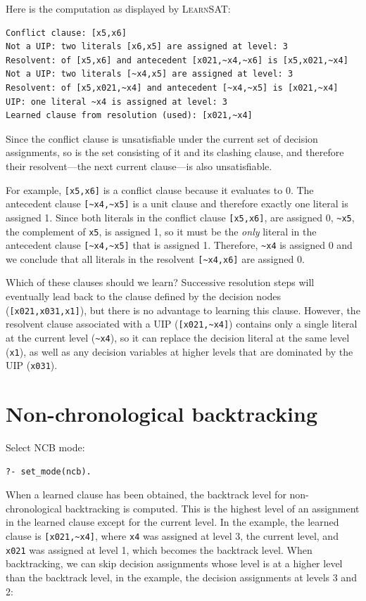 \documentclass[11pt]{report}
\newcommand*{\p}[1]{\textup{\texttt{#1}}}
\newcommand*{\ls}{\textsc{LearnSAT}}
\begin{document}
Here is the computation as displayed by \ls{}:
\begin{verbatim}
Conflict clause: [x5,x6]
Not a UIP: two literals [x6,x5] are assigned at level: 3
Resolvent: of [x5,x6] and antecedent [x021,~x4,~x6] is [x5,x021,~x4]
Not a UIP: two literals [~x4,x5] are assigned at level: 3
Resolvent: of [x5,x021,~x4] and antecedent [~x4,~x5] is [x021,~x4]
UIP: one literal ~x4 is assigned at level: 3
Learned clause from resolution (used): [x021,~x4]
\end{verbatim}

Since the conflict clause is unsatisfiable under the current set of
decision assignments, so is the set consisting of it and its clashing
clause, and therefore their resolvent---the next current clause---is
also unsatisfiable.

For example, \verb+[x5,x6]+ is a conflict clause because it evaluates to
0. The antecedent clause \verb+[~x4,~x5]+ is a unit clause and therefore
exactly one literal is assigned 1. Since both literals in the conflict
clause \verb+[x5,x6]+, are assigned 0, \verb+~x5+, the complement of
\verb+x5+, is assigned 1, so it must be the \emph{only} literal in the
antecedent clause \verb+[~x4,~x5]+ that is assigned 1. Therefore,
\verb+~x4+ is assigned 0 and we conclude that all literals in the
resolvent \verb+[~x4,x6]+ are assigned 0.

Which of these clauses should we learn? Successive resolution steps will
eventually lead back to the clause defined by the decision nodes
(\verb+[x021,x031,x1]+), but there is no advantage to learning this
clause. However, the resolvent clause associated with a UIP
(\verb+[x021,~x4]+) contains only a single literal at the current level
(\verb+~x4+), so it can replace the decision literal at the same level
(\verb+x1+), as well as any decision variables at higher levels that are
dominated by the UIP (\verb+x031+).

\newpage

\section{Non-chronological backtracking}

Select NCB mode:
\begin{verbatim}
?- set_mode(ncb).
\end{verbatim}

When a learned clause has been obtained, the backtrack level for
non-chronological backtracking is computed. This is the highest level of
an assignment in the learned clause except for the current level. In the
example, the learned clause is \verb+[x021,~x4]+, where \p{x4} was
assigned at level 3, the current level, and \p{x021} was assigned at
level 1, which becomes the backtrack level. When backtracking, we can
skip decision assignments whose level is at a higher level than the
backtrack level, in the example, the decision assignments at levels 3
and 2:
\end{document}
